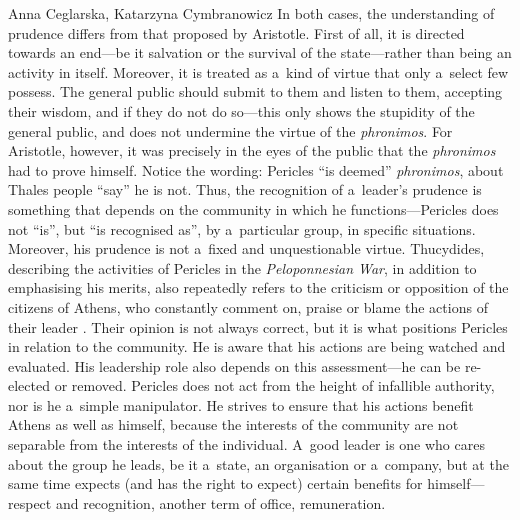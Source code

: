 \begin{artengenv2auth}{Anna Ceglarska, Katarzyna Cymbranowicz}
In both cases, the understanding of prudence differs from that proposed by Aristotle. First of all, it is directed towards an end---be it salvation or the survival of the state---rather than being an activity in itself. Moreover, it is treated as a~kind of virtue that only a~select few possess. The general public should submit to them and listen to them, accepting their wisdom, and if they do not do so---this only shows the stupidity of the general public, and does not undermine the virtue of the \textit{phronimos}. For Aristotle, however, it was precisely in the eyes of the public that the \textit{phronimos} had to prove himself. Notice the wording: Pericles ``is deemed'' \textit{phronimos}, about Thales people ``say'' he is not. Thus, the recognition of a~leader's prudence is something that depends on the community in which he functions---Pericles does not ``is'', but ``is recognised as'', by a~particular group, in specific situations. Moreover, his prudence is not a~fixed and unquestionable virtue. Thucydides, describing the activities of Pericles in the \textit{Peloponnesian War}, in addition to emphasising his merits, also repeatedly refers to the criticism or opposition of the citizens of Athens, who constantly comment on, praise or blame the actions of their leader 
\parencite[][]{hammond_peloponnesian_2009}. %
 Their opinion is not always correct, but it is what positions Pericles in relation to the community. He is aware that his actions are being watched and evaluated. His leadership role also depends on this assessment---he can be re-elected or removed. Pericles does not act from the height of infallible authority, nor is he a~simple manipulator. He strives to ensure that his actions benefit Athens as well as himself, because the interests of the community are not separable from the interests of the individual. A~good leader is one who cares about the group he leads, be it a~state, an organisation or a~company, but at the same time expects (and has the right to expect) certain benefits for himself---respect and recognition, another term of office, remuneration.




\end{artengenv2auth}

